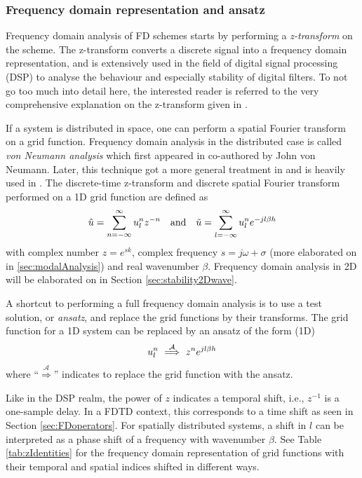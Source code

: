 \subsubsection{Frequency domain representation and ansatz}
Frequency domain analysis of FD schemes starts by performing a \textit{z-transform} on the scheme. The z-transform converts a discrete signal into a frequency domain representation, and is extensively used in the field of digital signal processing (DSP) to analyse the behaviour and especially stability of digital filters. To not go too much into detail here, the interested reader is referred to the very comprehensive explanation on the z-transform given in \cite[Ch. 5]{Park2010}. 

If a system is distributed in space, one can perform a spatial Fourier transform on a grid function. Frequency domain analysis in the distributed case is called \textit{von Neumann analysis} which first appeared in \cite{vonNeumann} co-authored by John von Neumann. Later, this technique got a more general treatment in \cite{Strikwerda1989} and is heavily used in \cite{theBible}. The discrete-time z-transform and discrete spatial Fourier transform performed on a 1D grid function are defined as \cite{theBible}
\begin{equation}
    \hat u  = \sum_{n=-\infty}^\infty u_l^n z^{-n}\quad \text{and} \quad \tilde u = \sum_{l=-\infty}^\infty u_l^n e^{-jl\beta h}
\end{equation}
with complex number $z = e^{sk}$, complex frequency $s=j\omega + \sigma$ (more elaborated on in \ref{sec:modalAnalysis}) and real wavenumber $\beta$. Frequency domain analysis in 2D will be elaborated on in Section \ref{sec:stability2Dwave}.

A shortcut to performing a full frequency domain analysis is to use a test solution, or \textit{ansatz}, and replace the grid functions by their transforms. The grid function for a 1D system can be replaced by an ansatz of the form (1D) \cite{theBible}
\begin{equation}\label{eq:ansatz}
    u_l^n \ \overset{\mathcal{A}}{\Longrightarrow}\  z^n e^{jl\beta h}
\end{equation} 
where ``$\overset{\mathcal{A}}{\Longrightarrow}$'' indicates to replace the grid function with the ansatz. 

Like in the DSP realm, the power of $z$ indicates a temporal shift, i.e., $z^{-1}$ is a one-sample delay. In a FDTD context, this corresponds to a time shift as seen in Section \ref{sec:FDoperators}. For spatially distributed systems, a shift in $l$ can be interpreted as a phase shift of a frequency with wavenumber $\beta$. See Table \ref{tab:zIdentities} for the frequency domain representation of grid functions with their temporal and spatial indices shifted in different ways. 



